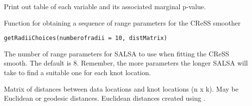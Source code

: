 \documentclass[a4paper]{book}
\begin{document}
%
\begin{Value}
Print out table of each variable and its associated marginal p-value.
\end{Value}
%
\begin{Examples}
\end{Examples}
%
\begin{Description}\relax
Function for obtaining a sequence of range parameters for the CReSS smoother
\end{Description}
%
\begin{Usage}
\begin{verbatim}
getRadiiChoices(numberofradii = 10, distMatrix)
\end{verbatim}
\end{Usage}
%
\begin{Arguments}
\begin{ldescription}
\item[\code{numberofradii}] The number of range parameters for SALSA to use when fitting the CReSS smooth.  The default is 8.  Remember, the more parameters the longer SALSA will take to find a suitable one for each knot location.

\item[\code{distMatrix}] Matrix of distances between data locations and knot locations (n x k). May be Euclidean or geodesic distances. Euclidean distances created using .
\end{ldescription}
\end{Arguments}
\end{document}
